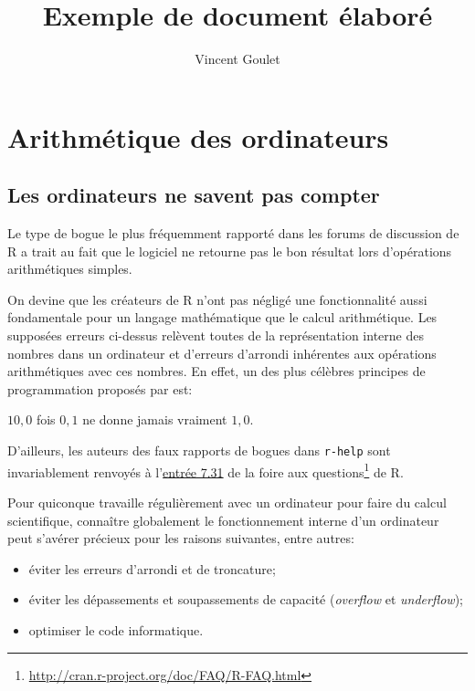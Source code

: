\documentclass[letterpaper,11pt,english,french]{memoir}
\title{Exemple de document élaboré}
\author{Vincent Goulet}
\theoremstyle{plain}
\theoremstyle{definition}
\theoremstyle{remark}
\begin{document}
\frontmatter                    %

\maketitle                      %

\tableofcontents                %
\cleardoublepage

\mainmatter                     %

\chapter{Arithmétique des ordinateurs}
\label{chap:ordinateurs}

\section{Les ordinateurs ne savent pas compter}
\label{sec:ordinateurs:introduction}

Le type de bogue le plus fréquemment rapporté dans les forums de
discussion de R a trait au fait que le logiciel ne retourne
pas le bon résultat lors d'opérations arithmétiques simples.

On devine que les créateurs de R n'ont pas négligé une fonctionnalité
aussi fondamentale pour un langage mathématique que le calcul
arithmétique. Les supposées erreurs ci-dessus relèvent toutes de la
représentation interne des nombres dans un ordinateur et d'erreurs
d'arrondi inhérentes aux opérations arithmétiques avec ces nombres. En
effet, un des plus célèbres principes de programmation proposés par
\cite{Kernighan:style:1978} est:
\begin{center}
  \label{programming_principle}
  $10,0$ fois $0,1$ ne donne jamais vraiment $1,0$.
\end{center}
D'ailleurs, les auteurs des faux rapports de bogues dans
\texttt{r-help} sont invariablement renvoyés à l'\href{http://cran.r-project.org/doc/FAQ/R-FAQ.html#Why-doesn_0027t-R-think-these-numbers-are-equal_003f}{entrée 7.31} de la
foire aux questions\footnote{%
  \url{http://cran.r-project.org/doc/FAQ/R-FAQ.html}} %
de R.

Pour quiconque travaille régulièrement avec un ordinateur pour faire
du calcul scientifique, connaître globalement le fonctionnement
interne d'un ordinateur peut s'avérer précieux pour les raisons
suivantes, entre autres:
\begin{itemize}
\item éviter les erreurs d'arrondi et de troncature;
\item éviter les dépassements et soupassements de capacité
  (\emph{overflow} et \emph{underflow});
\item optimiser le code informatique.
\end{itemize}
\end{document}
